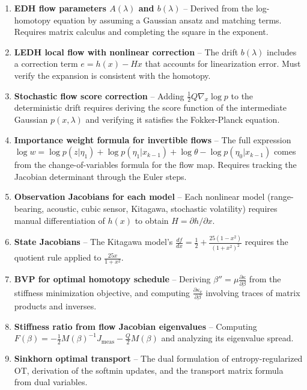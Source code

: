 \documentclass[12pt]{article}
\begin{document}
\begin{enumerate}
\item \textbf{EDH flow parameters $A(\lambda)$ and $b(\lambda)$} -- Derived from the log-homotopy equation by assuming a Gaussian ansatz and matching terms. Requires matrix calculus and completing the square in the exponent.

\item \textbf{LEDH local flow with nonlinear correction} -- The drift $b(\lambda)$ includes a correction term $e = h(x) - Hx$ that accounts for linearization error. Must verify the expansion is consistent with the homotopy.

\item \textbf{Stochastic flow score correction} -- Adding $\frac{1}{2}Q\nabla_x \log p$ to the deterministic drift requires deriving the score function of the intermediate Gaussian $p(x,\lambda)$ and verifying it satisfies the Fokker-Planck equation.

\item \textbf{Importance weight formula for invertible flows} -- The full expression $\log w = \log p(z|\eta_1) + \log p(\eta_1|x_{k-1}) + \log\theta - \log p(\eta_0|x_{k-1})$ comes from the change-of-variables formula for the flow map. Requires tracking the Jacobian determinant through the Euler steps.

\item \textbf{Observation Jacobians for each model} -- Each nonlinear model (range-bearing, acoustic, cubic sensor, Kitagawa, stochastic volatility) requires manual differentiation of $h(x)$ to obtain $H = \partial h/\partial x$.

\item \textbf{State Jacobians} -- The Kitagawa model's $\frac{df}{dx} = \frac{1}{2} + \frac{25(1-x^2)}{(1+x^2)^2}$ requires the quotient rule applied to $\frac{25x}{1+x^2}$.

\item \textbf{BVP for optimal homotopy schedule} -- Deriving $\beta'' = \mu \frac{\partial\kappa}{\partial\beta}$ from the stiffness minimization objective, and computing $\frac{\partial\kappa_\nu}{\partial\beta}$ involving traces of matrix products and inverses.

\item \textbf{Stiffness ratio from flow Jacobian eigenvalues} -- Computing $F(\beta) = -\frac{1}{2}M(\beta)^{-1}J_{\text{meas}} - \frac{Q}{2}M(\beta)$ and analyzing its eigenvalue spread.

\item \textbf{Sinkhorn optimal transport} -- The dual formulation of entropy-regularized OT, derivation of the softmin updates, and the transport matrix formula from dual variables.


\end{enumerate}
\end{document}
